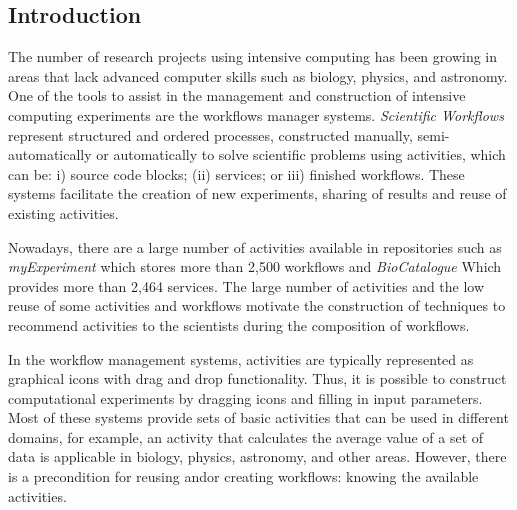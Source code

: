 \documentclass[40pt, a0, portrait]{a0poster}
\begin{document}
\begin{multicols}{2} %


\color{Navy} %

\section*{Introduction}

The number of research projects using intensive computing has been growing in areas that lack advanced computer skills such as biology, physics, and astronomy. One of the tools to assist in the management and construction of intensive computing experiments are the workflows manager systems. \emph{Scientific Workflows} represent structured and ordered processes, constructed manually, semi-automatically or automatically to solve scientific problems using activities, which can be: i) source code blocks; (ii) services; or iii) finished workflows. These systems facilitate the creation of new experiments, sharing of results and reuse of existing activities.

Nowadays, there are a large number of activities available in repositories such as \emph{myExperiment} which stores more than 2,500 workflows and \emph{BioCatalogue} Which provides more than 2,464 services. The large number of activities and the low reuse of some activities and workflows motivate the construction of techniques to recommend activities to the scientists during the composition of workflows.

In the workflow management systems, activities are typically represented as graphical icons with drag and drop functionality. Thus, it is possible to construct computational experiments by dragging icons and filling in input parameters. Most of these systems provide sets of basic activities that can be used in different domains, for example, an activity that calculates the average value of a set of data is applicable in biology, physics, astronomy, and other areas. However, there is a precondition for reusing and\/or creating workflows: knowing the available activities.


\end{multicols}
\end{document}
